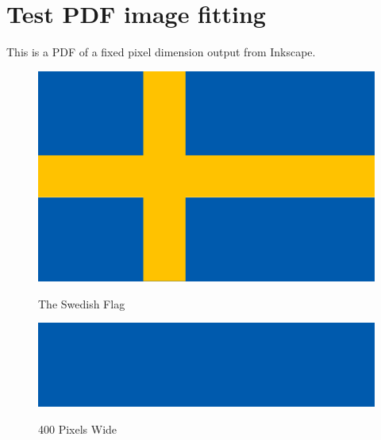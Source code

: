 \chapter{Test PDF image fitting}

This is a PDF of a fixed pixel dimension output from Inkscape.

\begin{figure}[h]
	\centering
	\includegraphics[width=1.0\textwidth]{images/swedish_flag}
	\centering\bfseries
	\caption{The Swedish Flag}
\end{figure}


\begin{figure}[h]
	\centering
	\includegraphics[width=1.0\textwidth]{images/400_pixel_width}
	\centering\bfseries
	\caption{400 Pixels Wide}
\end{figure}